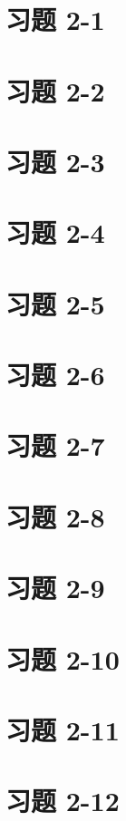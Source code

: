 \documentclass[UTF8,12pt,a4paper]{ctexart} %
\begin{document}
\section*{习题 2-1}



\section*{习题 2-2}



\section*{习题 2-3}



\section*{习题 2-4}



\section*{习题 2-5}



\section*{习题 2-6}



\section*{习题 2-7}



\section*{习题 2-8}



\section*{习题 2-9}



\section*{习题 2-10}



\section*{习题 2-11}



\section*{习题 2-12}


\end{document}
